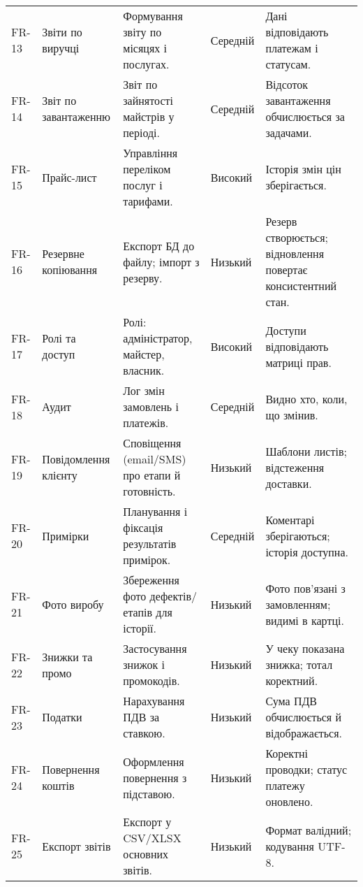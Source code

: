 \documentclass[14pt,a4paper]{extarticle}
\begin{document}
\begin{longtable}{@{}p{1.6cm} p{4.2cm} p{7.2cm} p{1.7cm} p{6.0cm}@{}}
FR-13 & Звіти по виручці & Формування звіту по місяцях і послугах. & Середній & Дані відповідають платежам і статусам. \\
FR-14 & Звіт по завантаженню & Звіт по зайнятості майстрів у періоді. & Середній & Відсоток завантаження обчислюється за задачами. \\
FR-15 & Прайс-лист & Управління переліком послуг і тарифами. & Високий & Історія змін цін зберігається. \\
FR-16 & Резервне копіювання & Експорт БД до файлу; імпорт з резерву. & Низький & Резерв створюється; відновлення повертає консистентний стан. \\
FR-17 & Ролі та доступ & Ролі: адміністратор, майстер, власник. & Високий & Доступи відповідають матриці прав. \\
FR-18 & Аудит & Лог змін замовлень і платежів. & Середній & Видно хто, коли, що змінив. \\
FR-19 & Повідомлення клієнту & Сповіщення (email/SMS) про етапи й готовність. & Низький & Шаблони листів; відстеження доставки. \\
FR-20 & Примірки & Планування і фіксація результатів примірок. & Середній & Коментарі зберігаються; історія доступна. \\
FR-21 & Фото виробу & Збереження фото дефектів/етапів для історії. & Низький & Фото пов’язані з замовленням; видимі в картці. \\
FR-22 & Знижки та промо & Застосування знижок і промокодів. & Низький & У чеку показана знижка; тотал коректний. \\
FR-23 & Податки & Нарахування ПДВ за ставкою. & Низький & Сума ПДВ обчислюється й відображається. \\
FR-24 & Повернення коштів & Оформлення повернення з підставою. & Низький & Коректні проводки; статус платежу оновлено. \\
FR-25 & Експорт звітів & Експорт у CSV/XLSX основних звітів. & Низький & Формат валідний; кодування UTF-8. \\
\bottomrule
\end{longtable}
\end{document}
